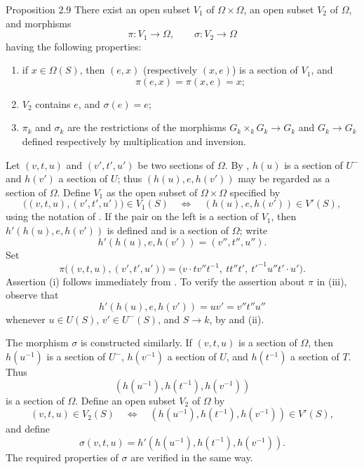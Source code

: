 \begin{sgastatement}{Proposition 2.9}
There exist an open subset \(V_1\) of \(\Omega\times\Omega\), an open
subset \(V_2\) of \(\Omega\), and morphisms
\[
 \pi\colon V_1\longrightarrow\Omega,\qquad
 \sigma\colon V_2\longrightarrow\Omega
\]
having the following properties:
\begin{enumerate}[label=\textup{(\roman*)},leftmargin=2.2em]
\item if \(x\in\Omega(S)\), then \((e,x)\) (respectively \((x,e)\)) is a
section of \(V_1\), and
\[
 \pi(e,x)=\pi(x,e)=x;
\]
\item \(V_2\) contains \(e\), and \(\sigma(e)=e\);
\item{} \(\pi_k\) and \(\sigma_k\) are the restrictions of the morphisms
\(G_k\times_kG_k\to G_k\) and \(G_k\to G_k\) defined respectively by
multiplication and inversion.
\end{enumerate}
\end{sgastatement}

\SGAProof
Let \((v,t,u)\) and \((v',t',u')\) be two sections of \(\Omega\).
By , \(h(u)\) is a section of \(U^-\) and \(h(v')\) a section
of \(U\); thus \((h(u),e,h(v'))\) may be regarded as a section of
\(\Omega\). Define \(V_1\) as the open subset of \(\Omega\times\Omega\)
specified by
\[
\bigl((v,t,u),(v',t',u')\bigr)\in V_1(S)
\quad\Longleftrightarrow\quad
(h(u),e,h(v'))\in V'(S),
\]
using the notation of . If the pair on the left is a section of
\(V_1\), then \(h'(h(u),e,h(v'))\) is defined and is a section of
\(\Omega\); write
\[
 h'(h(u),e,h(v'))=(v'',t'',u'').
\]
Set
\[
 \pi\bigl((v,t,u),(v',t',u')\bigr)
 =
 \bigl(v\cdot t v''t^{-1},\ tt''t',\
 t'^{-1}u''t'\cdot u'\bigr).
\]
Assertion (i) follows immediately from . To verify the assertion
about \(\pi\) in (iii), observe that
\[
 h'(h(u),e,h(v'))=uv'=v''t''u''
\]
whenever \(u\in U(S)\), \(v'\in U^-(S)\), and \(S\to k\), by
 and (ii).

The morphism \(\sigma\) is constructed similarly. If \((v,t,u)\) is a
section of \(\Omega\), then \(h(u^{-1})\) is a section of \(U^-\),
\(h(v^{-1})\) a section of \(U\), and \(h(t^{-1})\) a section of \(T\).
Thus
\[
 (h(u^{-1}),h(t^{-1}),h(v^{-1}))
\]
is a section of \(\Omega\).
Define an open subset \(V_2\) of \(\Omega\) by
\[
 (v,t,u)\in V_2(S)
 \quad\Longleftrightarrow\quad
 (h(u^{-1}),h(t^{-1}),h(v^{-1}))\in V'(S),
\]
and define
\[
 \sigma(v,t,u)=h'(h(u^{-1}),h(t^{-1}),h(v^{-1})).
\]
The required properties of \(\sigma\) are verified in the same way.
